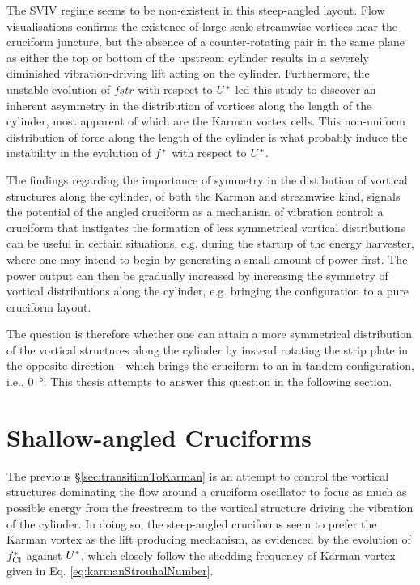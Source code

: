 \documentclass[oneside]{utmthesis}
\begin{document}
The SVIV regime seems to be non-existent in this steep-angled layout. Flow visualisations confirms the existence of large-scale streamwise vortices near the cruciform juncture, but the absence of a counter-rotating pair in the same plane as either the top or bottom of the upstream cylinder results in a severely diminished vibration-driving lift acting on the cylinder. Furthermore, the unstable evolution of $fstr$ with respect to $U^{*}$ led this study to discover an inherent asymmetry in the distribution of vortices along the length of the cylinder, most apparent of which are the Karman vortex cells. This non-uniform distribution of force along the length of the cylinder is what probably induce the instability in the evolution of $f^{*}$ with respect to $U^{*}$. 

The findings regarding the importance of symmetry in the distibution of vortical structures along the cylinder, of both the Karman and streamwise kind, signals the potential of the angled cruciform as a mechanism of vibration control: a cruciform that instigates the formation of less symmetrical vortical distributions can be useful in certain situations, e.g. during the startup of the energy harvester, where one may intend to begin by generating a small amount of power first. The power output can then be gradually increased by increasing the symmetry of vortical distributions along the cylinder, e.g. bringing the configuration to a pure cruciform layout.

The question is therefore whether one can attain a more symmetrical distribution of the vortical structures along the cylinder by instead rotating the strip plate in the opposite direction - which brings the cruciform to an in-tandem configuration, i.e., \SI{0}{\degree}. This thesis attempts to answer this question in the following section.

\section{Shallow-angled Cruciforms}\label{sec:kvivRegime}
The previous \S\ref{sec:transitionToKarman} is an attempt to control the vortical structures dominating the flow around a cruciform oscillator to focus as much as possible energy from the freestream to the vortical structure driving the vibration of the cylinder. In doing so, the steep-angled cruciforms seem to prefer the Karman vortex as the lift producing mechanism, as evidenced by the evolution of $f_{\text{Cl}}^{*}$ against $U^{*}$, which closely follow the shedding frequency of Karman vortex given in Eq. \ref{eq:karmanStrouhalNumber}.
\end{document}
